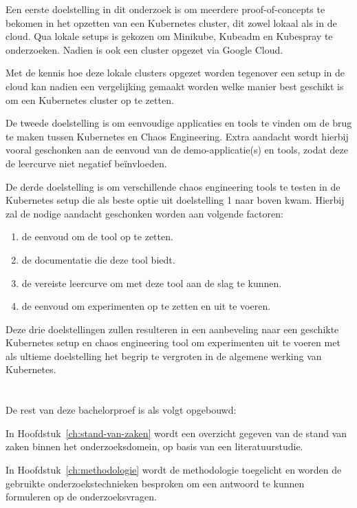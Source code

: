 Een eerste doelstelling in dit onderzoek is om meerdere proof-of-concepts te bekomen in het opzetten van een Kubernetes cluster, dit zowel lokaal als in de cloud. Qua lokale setups is gekozen om Minikube, Kubeadm en Kubespray te onderzoeken. Nadien is ook een cluster opgezet via Google Cloud. 

Met de kennis hoe deze lokale clusters opgezet worden tegenover een setup in de cloud kan nadien een vergelijking gemaakt worden welke manier best geschikt is om een Kubernetes cluster op te zetten.

De tweede doelstelling is om eenvoudige applicaties en tools te vinden om de brug te maken tussen Kubernetes en Chaos Engineering. Extra aandacht wordt hierbij vooral geschonken aan de eenvoud van de demo-applicatie(s) en tools, zodat deze de leercurve niet negatief beïnvloeden.

De derde doelstelling is om verschillende chaos engineering tools te testen in de Kubernetes setup die als beste optie uit doelstelling 1 naar boven kwam. Hierbij zal de nodige aandacht geschonken worden aan volgende factoren:
\begin{enumerate}
    \item de eenvoud om de tool op te zetten.
    \item de documentatie die deze tool biedt.
    \item de vereiste leercurve om met deze tool aan de slag te kunnen.
    \item de eenvoud om experimenten op te zetten en uit te voeren. 
\end{enumerate} 

Deze drie doelstellingen zullen resulteren in een aanbeveling naar een geschikte Kubernetes setup en chaos engineering tool om experimenten uit te voeren met als ultieme doelstelling het begrip te vergroten in de algemene werking van Kubernetes.    

\section{}
\label{sec:opzet-bachelorproef}

De rest van deze bachelorproef is als volgt opgebouwd:

In Hoofdstuk~\ref{ch:stand-van-zaken} wordt een overzicht gegeven van de stand van zaken binnen het onderzoeksdomein, op basis van een literatuurstudie.

In Hoofdstuk~\ref{ch:methodologie} wordt de methodologie toegelicht en worden de gebruikte onderzoekstechnieken besproken om een antwoord te kunnen formuleren op de onderzoeksvragen.

